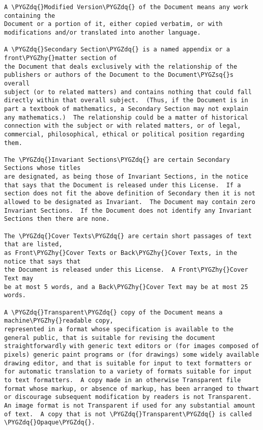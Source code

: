 \documentclass[letterpaper,10pt,english]{sphinxmanual}
\def\PYGZhy{\char`\-}
\def\PYGZsq{\char`\'}
\def\PYGZdq{\char`\"}
\renewcommand\PYGZsq{\textquotesingle}
\begin{document}
\begin{Verbatim}[frame=single,commandchars=\\\{\}]
A \PYGZdq{}Modified Version\PYGZdq{} of the Document means any work containing the
Document or a portion of it, either copied verbatim, or with
modifications and/or translated into another language.

A \PYGZdq{}Secondary Section\PYGZdq{} is a named appendix or a front\PYGZhy{}matter section of
the Document that deals exclusively with the relationship of the
publishers or authors of the Document to the Document\PYGZsq{}s overall
subject (or to related matters) and contains nothing that could fall
directly within that overall subject.  (Thus, if the Document is in
part a textbook of mathematics, a Secondary Section may not explain
any mathematics.)  The relationship could be a matter of historical
connection with the subject or with related matters, or of legal,
commercial, philosophical, ethical or political position regarding
them.

The \PYGZdq{}Invariant Sections\PYGZdq{} are certain Secondary Sections whose titles
are designated, as being those of Invariant Sections, in the notice
that says that the Document is released under this License.  If a
section does not fit the above definition of Secondary then it is not
allowed to be designated as Invariant.  The Document may contain zero
Invariant Sections.  If the Document does not identify any Invariant
Sections then there are none.

The \PYGZdq{}Cover Texts\PYGZdq{} are certain short passages of text that are listed,
as Front\PYGZhy{}Cover Texts or Back\PYGZhy{}Cover Texts, in the notice that says that
the Document is released under this License.  A Front\PYGZhy{}Cover Text may
be at most 5 words, and a Back\PYGZhy{}Cover Text may be at most 25 words.

A \PYGZdq{}Transparent\PYGZdq{} copy of the Document means a machine\PYGZhy{}readable copy,
represented in a format whose specification is available to the
general public, that is suitable for revising the document
straightforwardly with generic text editors or (for images composed of
pixels) generic paint programs or (for drawings) some widely available
drawing editor, and that is suitable for input to text formatters or
for automatic translation to a variety of formats suitable for input
to text formatters.  A copy made in an otherwise Transparent file
format whose markup, or absence of markup, has been arranged to thwart
or discourage subsequent modification by readers is not Transparent.
An image format is not Transparent if used for any substantial amount
of text.  A copy that is not \PYGZdq{}Transparent\PYGZdq{} is called \PYGZdq{}Opaque\PYGZdq{}.


\end{Verbatim}
\end{document}
